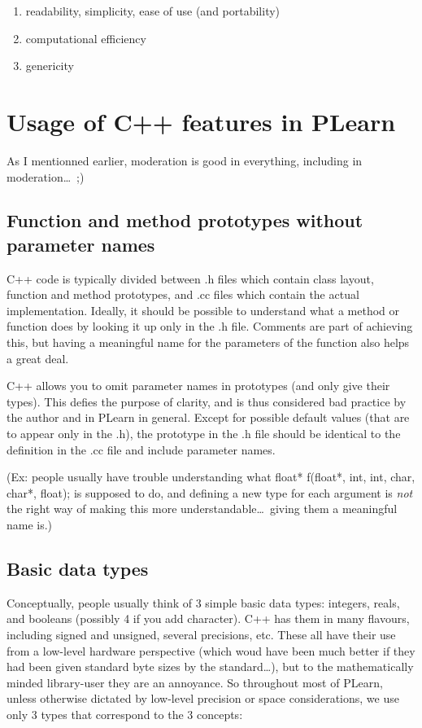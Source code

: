 \documentclass[11pt]{book}
\begin{document}
\begin{enumerate}
\item  readability, simplicity, ease of use (and portability)
\item  computational efficiency
\item  genericity
\end{enumerate}

\section{Usage of C++ features in PLearn}

 As I mentionned earlier, moderation is good in everything, including in
 moderation\ldots\ ;) 

\subsection*{Function and method prototypes without parameter names}
 C++ code is typically divided between .h files which contain class
layout, function and method prototypes, and .cc files which contain the
actual implementation. Ideally, it should be possible to understand
what a method or function does by looking it up only in the .h
file. Comments are part of achieving this, but having a meaningful
name for the parameters of the function also helps a great deal.

 C++ allows you to omit parameter names in prototypes (and only
give their types). This defies the purpose of clarity, and is thus
considered bad practice by the author and in PLearn in general. Except
for possible default values (that are to appear only in the .h),
the prototype in the .h file should be identical to the definition
in the .cc file and include parameter names.

 (Ex: people usually have trouble understanding what float* f(float*,
int, int, char, char*, float); is supposed to do, and defining a new
type for each argument is \emph{not} the right way of making this
more understandable\ldots\ giving them a meaningful name is.)

\subsection*{Basic data types}
 Conceptually, people usually think of 3 simple basic data types:
integers, reals, and booleans (possibly 4 if you add character). C++
has them in many flavours, including signed and unsigned, several
precisions, etc. These all have their use from a low-level hardware
perspective (which woud have been much better if they had been given
standard byte sizes by the standard\ldots), but to the mathematically
minded library-user they are an annoyance. So throughout most of
PLearn, unless otherwise dictated by low-level precision or space
considerations, we use only 3 types that correspond to the 3 concepts:
\end{document}
